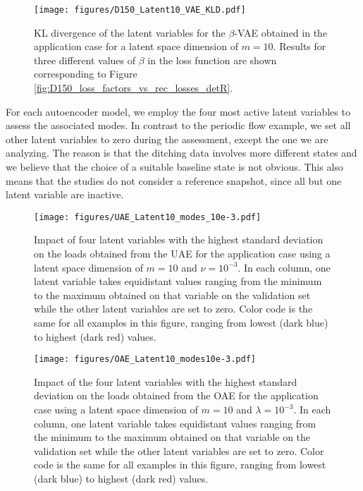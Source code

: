 \begin{figure}[h!]
    \centering
    \texttt{[image: figures/D150\_Latent10\_VAE\_KLD.pdf]}
    \caption{KL divergence of the latent variables for the $\beta$-VAE  obtained in the application case for a latent space dimension of $m=10$. Results for three different values of $\beta$ in the loss function are shown corresponding to Figure \ref{fig:D150_loss_factors_vs_rec_losses_detR}.}
    \label{fig:D150_Latent10_vae_KLD}
\end{figure}

For each autoencoder model, we employ the four most active latent variables
to assess the associated modes. In contrast to the 
periodic flow example, we set all other latent variables to zero during the assessment, except the one we are analyzing. The reason is that the ditching data involves more different states and we believe that the choice of a suitable baseline state is not obvious. This also means that the studies do not consider a reference snapshot, since all but one latent variable are inactive.



\begin{figure}[h!]
    \centering
    \texttt{[image: figures/UAE\_Latent10\_modes\_10e-3.pdf]}
    \caption{Impact of four latent variables with the highest standard deviation on the loads obtained from the UAE for the application case using a latent space dimension of $m=10$ and $\nu=10^{-3}$. 
    In each column,  one latent variable takes equidistant values ranging from the minimum to the maximum obtained on that variable on the validation set while the other latent variables are set to zero.
    Color code is the same for all examples in this figure, ranging from lowest (dark blue) to highest (dark red) values.}
    \label{fig:D150_UAE_Latent10_modes}
\end{figure}

\begin{figure}[h!]
    \centering
    \texttt{[image: figures/OAE\_Latent10\_modes10e-3.pdf]}
    \caption{Impact of the four latent variables with the highest standard deviation on the loads obtained from the OAE for the application case using a latent space dimension of $m=10$ and $\lambda=10^{-3}$. 
    In each column, one latent variable takes equidistant values ranging from the minimum to the maximum obtained on that variable on the validation set while the other latent variables are set to zero.
    Color code is the same for all examples in this figure, ranging from lowest (dark blue) to highest (dark red) values.}
    \label{fig:D150_OAE_Latent10_modes}
\end{figure}

